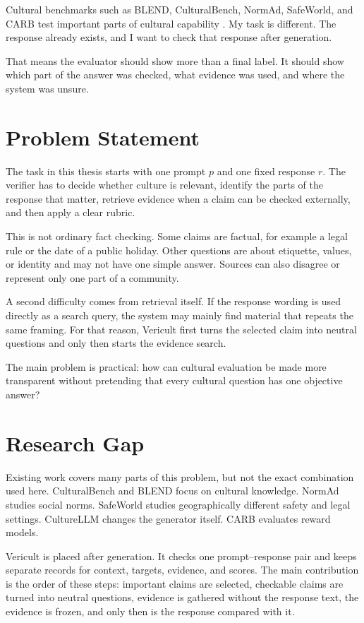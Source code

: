 Cultural benchmarks such as BLEND, CulturalBench, NormAd, SafeWorld, and CARB test important parts of cultural capability \parencite{myung2024blend,chiu2025culturalbench,rao2025normad,yin2024safeworld,zhang2025carb}. My task is different. The response already exists, and I want to check that response after generation.

That means the evaluator should show more than a final label. It should show which part of the answer was checked, what evidence was used, and where the system was unsure.
\section{Problem Statement}

The task in this thesis starts with one prompt $p$ and one fixed response $r$. The verifier has to decide whether culture is relevant, identify the parts of the response that matter, retrieve evidence when a claim can be checked externally, and then apply a clear rubric.

This is not ordinary fact checking. Some claims are factual, for example a legal rule or the date of a public holiday. Other questions are about etiquette, values, or identity and may not have one simple answer. Sources can also disagree or represent only one part of a community.

A second difficulty comes from retrieval itself. If the response wording is used directly as a search query, the system may mainly find material that repeats the same framing. For that reason, Vericult first turns the selected claim into neutral questions and only then starts the evidence search.

The main problem is practical: how can cultural evaluation be made more transparent without pretending that every cultural question has one objective answer?
\section{Research Gap}

Existing work covers many parts of this problem, but not the exact combination used here. CulturalBench and BLEND focus on cultural knowledge. NormAd studies social norms. SafeWorld studies geographically different safety and legal settings. CultureLLM changes the generator itself. CARB evaluates reward models.

Vericult is placed after generation. It checks one prompt--response pair and keeps separate records for context, targets, evidence, and scores. The main contribution is the order of these steps: important claims are selected, checkable claims are turned into neutral questions, evidence is gathered without the response text, the evidence is frozen, and only then is the response compared with it.

